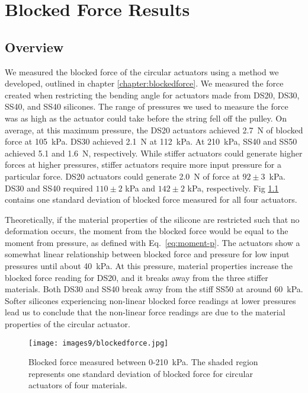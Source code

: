 \chapter{Blocked Force Results}

\section*{Overview}

We measured the blocked force of the circular actuators using a method we developed, outlined in chapter \ref{chapter:blockedforce}. We measured the force created when restricting the bending angle for actuators made from DS20, DS30, SS40, and SS40 silicones. The range of pressures we used to measure the force was as high as the actuator could take before the string fell off the pulley. On average, at this maximum pressure, the DS20 actuators achieved 2.7~N of blocked force at 105~kPa. DS30 achieved 2.1~N at 112~kPa. At 210~kPa, SS40 and SS50 achieved 5.1 and 1.6~N, respectively. While stiffer actuators could generate higher forces at higher pressures, stiffer actuators require more input pressure for a particular force. DS20 actuators could generate 2.0~N of force at $92\pm3$~kPa. DS30 and SS40 required $110\pm2$ kPa and $142\pm2$ kPa, respectively. Fig \ref{fig:blockedforce} contains one standard deviation of blocked force measured for all four actuators. 

Theoretically, if the material properties of the silicone are restricted such that no deformation occurs, the moment from the blocked force would be equal to the moment from pressure, as defined with Eq.~\ref{eq:moment-p}. The actuators show a somewhat linear relationship between blocked force and pressure for low input pressures until about 40~kPa. At this pressure, material properties increase the blocked force reading for DS20, and it breaks away from the three stiffer materials. Both DS30 and SS40 break away from the stiff SS50 at around 60~kPa. Softer silicones experiencing non-linear blocked force readings at lower pressures lead us to conclude that the non-linear force readings are due to the material properties of the circular actuator.
\\
\begin{figure}[ht]
    \centering
     \texttt{[image: images9/blockedforce.jpg]}
    \caption{Blocked force measured between 0-210~kPa. The shaded region represents one standard deviation of blocked force for circular actuators of four materials.}
    \label{fig:blockedforce}
\end{figure}

